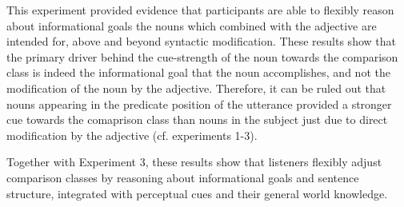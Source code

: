 This experiment provided evidence that participants are able to flexibly reason about informational goals the nouns which combined with the adjective are intended for, above and beyond syntactic modification. These results show that the primary driver behind the cue-strength of the noun towards the comparison class is indeed the informational goal that the noun accomplishes, and not the modification of the noun by the adjective.  Therefore, it can be ruled out that nouns appearing in the predicate position of the utterance provided a stronger cue towards the comaprison class than nouns in the subject just due to direct modification by the adjective (cf. experiments 1-3). 

Together with Experiment 3, these results show that listeners flexibly adjust comparison classes by reasoning about informational goals and sentence structure, integrated with perceptual cues and their general world knowledge.   
   

